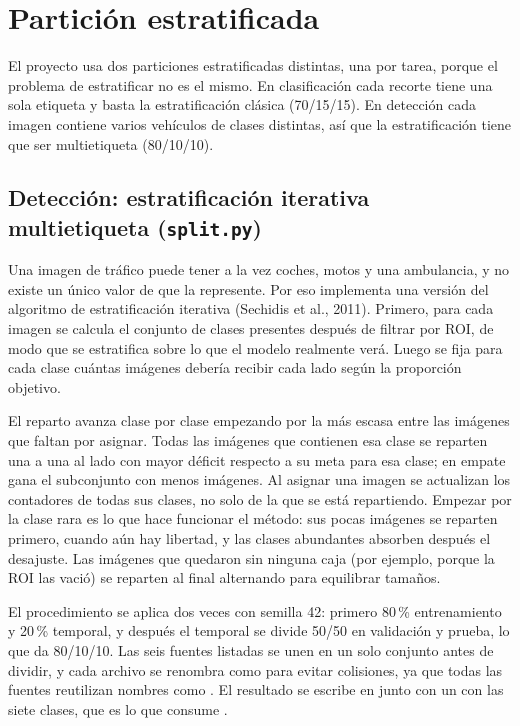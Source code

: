 \documentclass[11pt,a4paper]{article}
\begin{document}
\section{Partición estratificada}

El proyecto usa dos particiones estratificadas distintas, una por tarea, porque el problema de estratificar no es el mismo. En clasificación cada recorte tiene una sola etiqueta y basta la estratificación clásica (70/15/15). En detección cada imagen contiene varios vehículos de clases distintas, así que la estratificación tiene que ser multietiqueta (80/10/10).

\subsection{Detección: estratificación iterativa multietiqueta (\texorpdfstring{\texttt{split.py}}{split.py})}

Una imagen de tráfico puede tener a la vez coches, motos y una ambulancia, y no existe un único valor de  que la represente. Por eso  implementa una versión del algoritmo de estratificación iterativa (Sechidis et al., 2011). Primero, para cada imagen se calcula el conjunto de clases presentes después de filtrar por ROI, de modo que se estratifica sobre lo que el modelo realmente verá. Luego se fija para cada clase cuántas imágenes debería recibir cada lado según la proporción objetivo.

El reparto avanza clase por clase empezando por la más escasa entre las imágenes que faltan por asignar. Todas las imágenes que contienen esa clase se reparten una a una al lado con mayor déficit respecto a su meta para esa clase; en empate gana el subconjunto con menos imágenes. Al asignar una imagen se actualizan los contadores de todas sus clases, no solo de la que se está repartiendo. Empezar por la clase rara es lo que hace funcionar el método: sus pocas imágenes se reparten primero, cuando aún hay libertad, y las clases abundantes absorben después el desajuste. Las imágenes que quedaron sin ninguna caja (por ejemplo, porque la ROI las vació) se reparten al final alternando para equilibrar tamaños.

El procedimiento se aplica dos veces con semilla 42: primero 80\,\% entrenamiento y 20\,\% temporal, y después el temporal se divide 50/50 en validación y prueba, lo que da 80/10/10. Las seis fuentes listadas se unen en un solo conjunto antes de dividir, y cada archivo se renombra como  para evitar colisiones, ya que todas las fuentes reutilizan nombres como . El resultado se escribe en  junto con un  con las siete clases, que es lo que consume .
\end{document}
